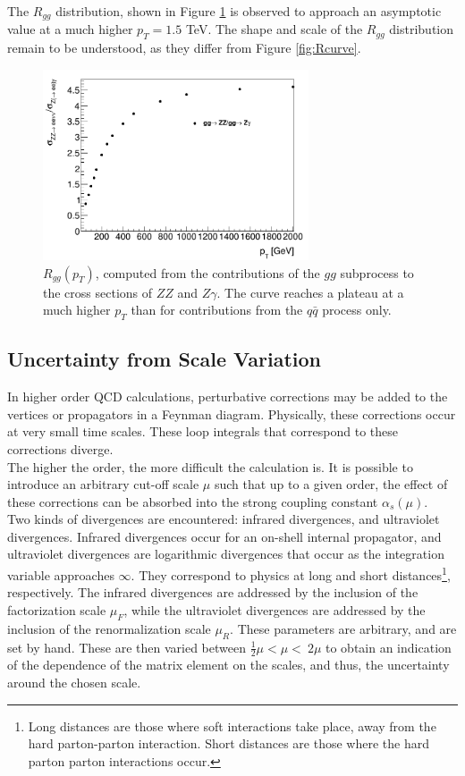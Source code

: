 \documentclass[11pt,a4paper]{report}
\begin{document}
The $R_{gg}$ distribution, shown in Figure \ref{fig:R_ggonly} is observed to approach an asymptotic value at a much higher $p_T = 1.5$ TeV. The shape and scale of the $R_{gg}$ distribution remain to be understood, as they differ from Figure \ref{fig:Rcurve}.
\begin{figure}[H]
\centering
\includegraphics[width=0.7\textwidth]{R_ggonly.png}
\caption{$R_{gg}(p_T)$, computed from the contributions of the $gg$ subprocess to the cross sections of $ZZ$ and $Z\gamma$. The curve reaches a plateau at a much higher $p_T$ than for contributions from the $q\bar{q}$ process only.}
\label{fig:R_ggonly}
\end{figure}

\subsection{Uncertainty from Scale Variation}
In higher order QCD calculations, perturbative corrections may be added to the vertices or propagators in a Feynman diagram. Physically, these corrections occur at very small time scales. These loop integrals that correspond to these corrections diverge.\\
The higher the order, the more difficult the calculation is. It is possible to introduce an arbitrary cut-off scale $\mu$ such that up to a given order, the effect of these corrections can be absorbed into the strong coupling constant $\alpha_s(\mu)$.\\
Two kinds of divergences are encountered: infrared divergences, and ultraviolet divergences. Infrared divergences occur for an on-shell internal propagator, and ultraviolet divergences are logarithmic divergences that occur as the integration variable approaches $\infty$. They correspond to physics at long and short distances\footnote{Long distances are those where soft interactions take place, away from the hard parton-parton interaction. Short distances are those where the hard parton parton interactions occur.}, respectively. The infrared divergences are addressed by the inclusion of the factorization scale $\mu_F$, while the ultraviolet divergences are addressed by the inclusion of the renormalization scale $\mu_R$. These parameters are arbitrary, and are set by hand. These are then varied between $\frac{1}{2}\mu < \mu < \ 2\mu$ to obtain an indication of the dependence of the matrix element on the scales, and thus, the uncertainty around the chosen scale. 
\end{document}
